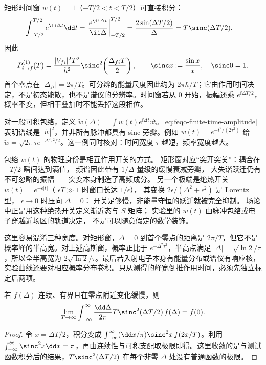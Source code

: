 矩形时间窗 \(w(t)=1\)（\(-T/2<t<T/2\)）可直接积分：
\begin{align*}
\int_{-T/2}^{T/2}e^{\ii\Delta t}\dd t
&=\left.\frac{e^{\ii\Delta t}}{\ii\Delta}\right|_{-T/2}^{T/2}
=\frac{2\sin(\Delta T/2)}{\Delta}
=T\sinc(\Delta T/2).
\end{align*}
因此
\begin{equation}
P_{i\to f}^{(1)}(T)=\frac{|V_{fi}|^2T^2}{\hbar^2}
\sinc^2\!\left(\frac{\Delta_{fi}T}{2}\right),
\qquad \sinc x:=\frac{\sin x}{x},\quad\sinc0=1.
\label{eq:feqo-sinc-amplitude}
\end{equation}
首个零点在 \(|\Delta_{fi}|=2\pi/T\)。可分辨的能量尺度因此约为 \(2\pi\hbar/T\)；它由作用时间决定，不是初态能散，也不是谱仪的分辨率。时间窗若从 \(0\) 开始，振幅还乘 \(e^{\ii\Delta T/2}\)，概率不变，但相干叠加时不能丢掉这段相位。

对一般可积包络，定义 \(\widetilde w(\Delta)=\int w(t)e^{\ii\Delta t}\dd t\)。\cref{eq:feqo-finite-time-amplitude} 表明谱线是 \(|\widetilde w|^2\)，并非所有脉冲都具有 sinc 旁瓣。例如 \(w(t)=e^{-t^2/(2\tau^2)}\) 给 \(\widetilde w=\sqrt{2\pi}\tau e^{-\Delta^2\tau^2/2}\)。这一例同时核对：时间宽度 \(\tau\) 越短，频率宽度越大。

包络 \(w(t)\) 的物理身份是相互作用开关的方式。
矩形窗对应“突开突关”：耦合在 \(-T/2\) 瞬间达到满值，
频谱因此带有 \(1/\Delta\) 量级的缓慢衰减旁瓣，
大失谐跃迁仍有不可忽略的振幅——突变本身制造了高频成分。
另一个极端是绝热开关 \(w(t)=e^{-\epsilon|t|}\)（
\(\epsilon T\gg1\) 时窗口长达 \(1/\epsilon\)），
其变换 \(2\epsilon/(\Delta^2+\epsilon^2)\) 是 Lorentz 型，
\(\epsilon\to0\) 时压向 \(\Delta=0\)：
开关足够慢，非能量守恒的跃迁就被完全抑制。
场论中正是用这种绝热开关定义渐近态与 \(S\) 矩阵；
实验里的 \(w(t)\) 由脉冲包络或电子穿越近场区的轨道决定，
不是可以随意假定的数学装饰。

这里容易混淆三种宽度。对矩形窗，\(\Delta=0\) 到首个零点的距离是 \(2\pi/T\)，但它不是概率峰的半高宽。对上述高斯窗，概率正比于 \(e^{-\Delta^2\tau^2}\)，半高点满足 \(|\Delta|=\sqrt{\ln2}/\tau\)，所以全半高宽为 \(2\sqrt{\ln2}/\tau\)。最后若入射电子本身有能量分布或谱仪有响应核，实验曲线还要对相应概率分布卷积。只从测得的峰宽倒推作用时间，必须先独立标定后两项。

\begin{proposition}[有限时间核的长时极限]
若 \(f(\Delta)\) 连续、有界且在零点附近变化缓慢，则
\begin{equation}
\lim_{T\to\infty}\int_{-\infty}^{\infty}\frac{\dd\Delta}{2\pi}
T\sinc^2(\Delta T/2)\,f(\Delta)=f(0).
\label{eq:feqo-finite-delta}
\end{equation}
\end{proposition}
\begin{proof}
令 \(x=\Delta T/2\)，积分变成
\(\int_{-\infty}^{\infty}(\dd x/\pi)\sinc^2x\,f(2x/T)\)。利用 \(\int_{-\infty}^{\infty}\sinc^2x\dd x=\pi\)，再由连续性与可积支配取极限即得。这里收敛的是与测试函数积分后的结果，\(T\sinc^2(\Delta T/2)\) 在每个非零 \(\Delta\) 处没有普通函数的极限。
\end{proof}

